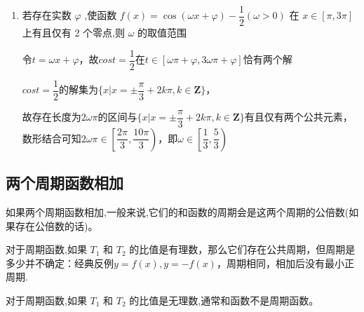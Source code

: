 \begin{enumerate}
\begin{jieda}
        假设$\omega < \dfrac{1}{2}$，则$sin\theta_1, sin\theta_2 \geq 0$，不满足要求.

        因此必有$\omega \geq \dfrac{1}{2}$，此时$sin\theta_1$可以取到$1$，故$sin\theta_2$必须要取到$-1$，故$2\omega\pi \geq \dfrac{3\pi}{4}$，即$\omega \geq \dfrac{3}{4}$，经检验$\omega = \dfrac{3}{4}$满足要求.
    \end{jieda}
    \item 若存在实数 $\varphi$ ,使函数 $f\left( x\right)  = \cos \left( {{\omega x} + \varphi }\right)  - \dfrac{1}{2}\left( {\omega  > 0}\right)$ 在 $x \in  \left\lbrack  {\pi ,{3\pi }}\right\rbrack$ 上有且仅有 2 个零点,则 $\omega$ 的取值范围\blkda{$\left[\dfrac{1}{3}, \dfrac{5}{3}\right)$}
    \begin{jieda}
        令$t = \omega x + \varphi$，故$cos t  = \dfrac{1}{2}$在$t \in [\omega \pi + \varphi, 3\omega \pi + \varphi]$恰有两个解

        $cost = \dfrac{1}{2}$的解集为$\{x| x = \pm \dfrac{\pi}{3} + 2k\pi, k \in \mathbf{Z}\}$，
        
        故存在长度为$2\omega \pi$的区间与$\{x| x = \pm \dfrac{\pi}{3} + 2k\pi, k \in \mathbf{Z}\}$有且仅有两个公共元素，数形结合可知$2\omega\pi \in \left[\dfrac{2\pi}{3}, \dfrac{10\pi}{3}\right)$，即$\omega \in \left[\dfrac{1}{3}, \dfrac{5}{3}\right)$
    \end{jieda}
\end{enumerate}
\subsection*{两个周期函数相加}
如果两个周期函数相加,一般来说,它们的和函数的周期会是这两个周期的公倍数(如果存在公倍数的话)。

对于周期函数,如果 ${T}_{1}$ 和 ${T}_{2}$ 的比值是有理数，那么它们存在公共周期，但周期是多少并不确定：经典反例$y = f(x), y = -f(x)$，周期相同，相加后没有最小正周期.

对于周期函数,如果 ${T}_{1}$ 和 ${T}_{2}$ 的比值是无理数,通常和函数不是周期函数。


